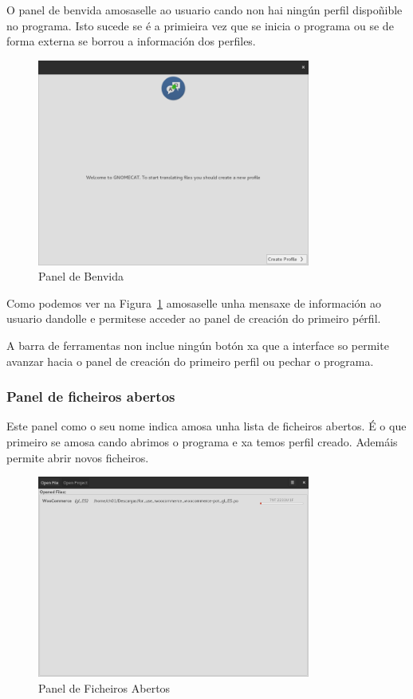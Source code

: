 O panel de benvida amosaselle ao usuario cando non hai ningún perfil dispoñible no programa. Isto sucede se é a primieira vez que se inicia o programa ou se de forma externa se borrou a información dos perfiles.

\begin{figure}[h!]
    \centering
    \includegraphics[width=0.8\textwidth]{img/panel_benvida.png}
    \caption{Panel de Benvida}
    \label{fig:ui:panel:welcome}
\end{figure}

Como podemos ver na Figura~\ref{fig:ui:panel:welcome} amosaselle unha mensaxe de información ao usuario dandolle e permitese acceder ao panel de creación do primeiro pérfil.

A barra de ferramentas non inclue ningún botón xa que a interface so permite avanzar hacia o panel de creación do primeiro perfil ou pechar o programa.

\subsubsection{Panel de ficheiros abertos}

Este panel como o seu nome indica amosa unha lista de ficheiros abertos. É o que primeiro se amosa cando abrimos o programa e xa temos perfil creado. Ademáis permite abrir novos ficheiros.

\begin{figure}[h!]
    \centering
    \includegraphics[width=0.8\textwidth]{img/panel_ficheiros_abertos.png}
    \caption{Panel de Ficheiros Abertos}
    \label{fig:ui:panel:openedfiles}
\end{figure}

